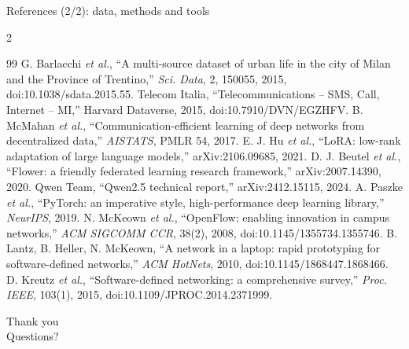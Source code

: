 \documentclass[11pt,aspectratio=169]{beamer}
\begin{document}
\begin{frame}{References (2/2): data, methods and tools}
  \begin{multicols}{2}
  \begin{thebibliography}{99}
    \setcounter{enumiv}{12} %
    \setlength{\itemsep}{2pt}\setlength{\parskip}{0pt}
     G. Barlacchi \emph{et al.}, ``A multi-source dataset of urban life in the city of Milan and the Province of Trentino,'' \emph{Sci. Data}, 2, 150055, 2015, doi:10.1038/sdata.2015.55.
     Telecom Italia, ``Telecommunications -- SMS, Call, Internet -- MI,'' Harvard Dataverse, 2015, doi:10.7910/DVN/EGZHFV.
     B. McMahan \emph{et al.}, ``Communication-efficient learning of deep networks from decentralized data,'' \emph{AISTATS}, PMLR 54, 2017.
     E. J. Hu \emph{et al.}, ``LoRA: low-rank adaptation of large language models,'' arXiv:2106.09685, 2021.
     D. J. Beutel \emph{et al.}, ``Flower: a friendly federated learning research framework,'' arXiv:2007.14390, 2020.
     Qwen Team, ``Qwen2.5 technical report,'' arXiv:2412.15115, 2024.
     A. Paszke \emph{et al.}, ``PyTorch: an imperative style, high-performance deep learning library,'' \emph{NeurIPS}, 2019.
     N. McKeown \emph{et al.}, ``OpenFlow: enabling innovation in campus networks,'' \emph{ACM SIGCOMM CCR}, 38(2), 2008, doi:10.1145/1355734.1355746.
     B. Lantz, B. Heller, N. McKeown, ``A network in a laptop: rapid prototyping for software-defined networks,'' \emph{ACM HotNets}, 2010, doi:10.1145/1868447.1868466.
     D. Kreutz \emph{et al.}, ``Software-defined networking: a comprehensive survey,'' \emph{Proc. IEEE}, 103(1), 2015, doi:10.1109/JPROC.2014.2371999.
  \end{thebibliography}
  \end{multicols}
\end{frame}

\begin{frame}
  \centering
  {\Huge Thank you}\\[12pt]
  {\Large Questions?}
\end{frame}
\end{document}
